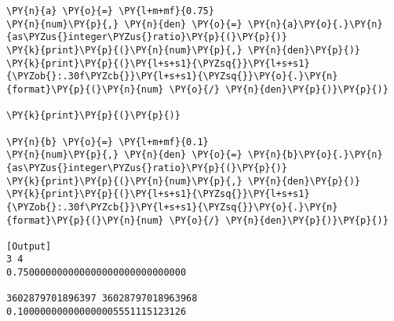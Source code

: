 \begin{Verbatim}[label=\makebox{\url{https://github.com/lucabaldini/cmepda/tree/master/slides/latex/snippets/float.py}},commandchars=\\\{\}]
\PY{n}{a} \PY{o}{=} \PY{l+m+mf}{0.75}
\PY{n}{num}\PY{p}{,} \PY{n}{den} \PY{o}{=} \PY{n}{a}\PY{o}{.}\PY{n}{as\PYZus{}integer\PYZus{}ratio}\PY{p}{(}\PY{p}{)}
\PY{k}{print}\PY{p}{(}\PY{n}{num}\PY{p}{,} \PY{n}{den}\PY{p}{)}
\PY{k}{print}\PY{p}{(}\PY{l+s+s1}{\PYZsq{}}\PY{l+s+s1}{\PYZob{}:.30f\PYZcb{}}\PY{l+s+s1}{\PYZsq{}}\PY{o}{.}\PY{n}{format}\PY{p}{(}\PY{n}{num} \PY{o}{/} \PY{n}{den}\PY{p}{)}\PY{p}{)}

\PY{k}{print}\PY{p}{(}\PY{p}{)}

\PY{n}{b} \PY{o}{=} \PY{l+m+mf}{0.1}
\PY{n}{num}\PY{p}{,} \PY{n}{den} \PY{o}{=} \PY{n}{b}\PY{o}{.}\PY{n}{as\PYZus{}integer\PYZus{}ratio}\PY{p}{(}\PY{p}{)}
\PY{k}{print}\PY{p}{(}\PY{n}{num}\PY{p}{,} \PY{n}{den}\PY{p}{)}
\PY{k}{print}\PY{p}{(}\PY{l+s+s1}{\PYZsq{}}\PY{l+s+s1}{\PYZob{}:.30f\PYZcb{}}\PY{l+s+s1}{\PYZsq{}}\PY{o}{.}\PY{n}{format}\PY{p}{(}\PY{n}{num} \PY{o}{/} \PY{n}{den}\PY{p}{)}\PY{p}{)}

[Output]
3 4
0.750000000000000000000000000000

3602879701896397 36028797018963968
0.100000000000000005551115123126
\end{Verbatim}